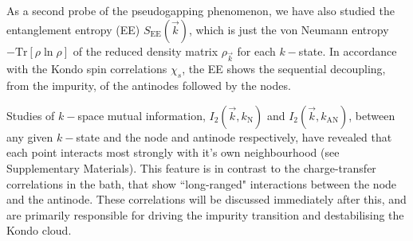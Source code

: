 \documentclass[reprint,hidelinks,onecolumn]{revtex4-2}
\begin{document}
As a second probe of the pseudogapping phenomenon, we have also studied the entanglement entropy (EE) \(S_\text{EE}(\vec k)\), which is just the von Neumann entropy \(-\text{Tr}\left[\rho \ln \rho\right] \) of the reduced density matrix \(\rho_{\vec k}\) for each \(k-\)state. In accordance with the Kondo spin correlations \(\chi_s\), the EE shows the sequential decoupling, from the impurity, of the antinodes followed by the nodes. 

Studies of \(k-\)space mutual information, \(I_2(\vec k, k_\text{N})\) and \(I_2(\vec k, k_\text{AN})\), between any given \(k-\)state and the node and antinode respectively, have revealed that each point interacts most strongly with it's own neighbourhood (see Supplementary Materials). This feature is in contrast to the charge-transfer correlations in the bath, that show ``long-ranged" interactions between the node and the antinode. These correlations will be discussed immediately after this, and are primarily responsible for driving the impurity transition and destabilising the Kondo cloud.
\end{document}
